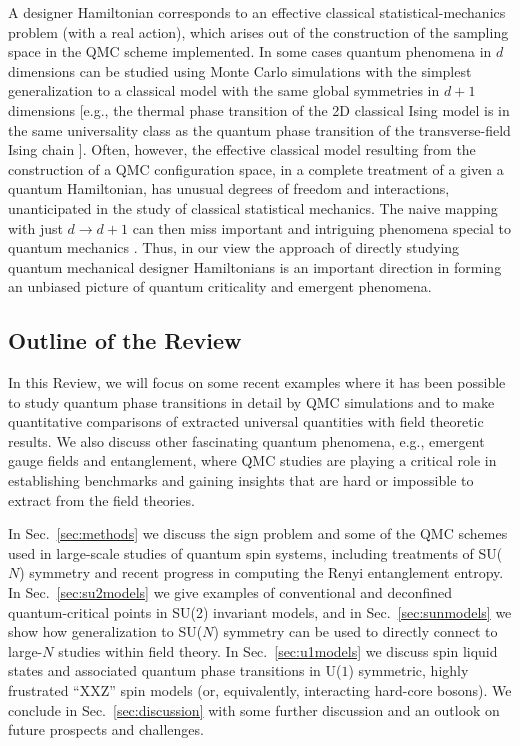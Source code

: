 \documentclass[10pt,pre,aps,twocolumn,showpacs,subscriptaddresses,floatfix]{revtex4}
\begin{document}
A designer Hamiltonian corresponds to an effective classical statistical-mechanics problem (with a real action), which arises out of the construction 
of the sampling space in the QMC scheme implemented. In some cases quantum phenomena in $d$ dimensions can be studied using Monte Carlo simulations with 
the simplest generalization to a classical model with the same global symmetries in $d+1$ dimensions \cite{Rieger94,Sorensen92,Nahum11} [e.g., the thermal 
phase transition of the 2D classical Ising model is in the same universality class as the quantum phase transition of the transverse-field Ising chain 
\cite{Suzuki76,Sachdev11}]. Often, however, the effective classical model resulting from the construction of a QMC configuration space, in a complete treatment
of a given a quantum Hamiltonian, has unusual degrees of freedom and interactions, unanticipated in the study of classical statistical mechanics. The naive 
mapping with just $d \to d+1$ can then miss important and intriguing phenomena special to quantum mechanics \cite{Senthil04a,Fradkin04,Sachdev08}. Thus, in our 
view the approach of directly studying quantum mechanical designer Hamiltonians is an important direction in forming an unbiased picture of quantum 
criticality and emergent phenomena.

\subsection{Outline of the Review}

In this Review, we will focus on some recent examples where it has been possible to study quantum phase transitions in detail 
by QMC simulations and to make quantitative comparisons of extracted universal quantities with field theoretic results. We also discuss other fascinating quantum phenomena, e.g., emergent gauge fields and entanglement, where QMC studies are
playing a critical role in establishing benchmarks and gaining insights that are hard or impossible to extract from the field theories.

In Sec.~\ref{sec:methods} we discuss the sign problem and some of the QMC schemes used in large-scale studies of quantum spin systems, 
including treatments of SU($N$) symmetry and recent progress in computing the Renyi entanglement entropy. In Sec.~\ref{sec:su2models} 
we give examples of conventional and deconfined quantum-critical points in SU(2) invariant models, and in Sec.~\ref{sec:sunmodels} 
we show how generalization to SU($N$) symmetry can be used to directly connect to large-$N$ studies within field theory. In Sec.~\ref{sec:u1models} 
we discuss spin liquid states and associated quantum phase transitions in U($1$) symmetric, highly frustrated ``XXZ'' spin models (or, equivalently, 
interacting hard-core bosons). We conclude in Sec.~\ref{sec:discussion} with some further discussion and an outlook on future prospects and challenges.
\end{document}
